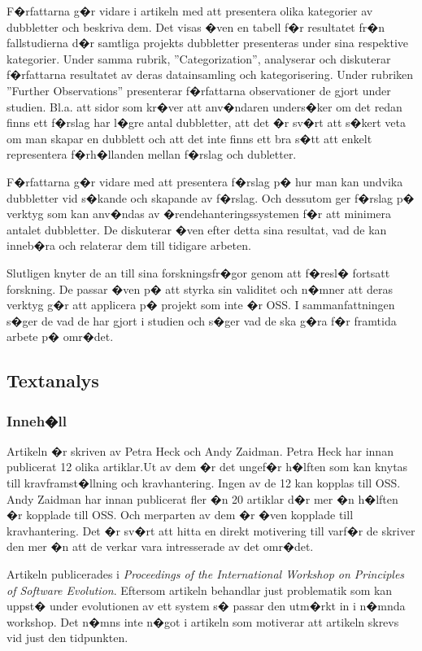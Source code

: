 \documentclass[11pt, oneside]{article}   	%
\begin{document}
F�rfattarna g�r vidare i artikeln med att presentera olika kategorier av dubbletter och beskriva dem. Det visas �ven en tabell f�r resultatet fr�n fallstudierna d�r samtliga projekts dubbletter presenteras under sina respektive kategorier. Under samma  rubrik, ''Categorization'', analyserar och diskuterar f�rfattarna resultatet av deras datainsamling och kategorisering. Under rubriken ''Further Observations'' presenterar f�rfattarna observationer de gjort under studien. Bl.a. att sidor som kr�ver att anv�ndaren unders�ker om det redan finns ett f�rslag har l�gre antal dubbletter, att det �r sv�rt att s�kert veta om man skapar en dubblett och att det inte finns ett bra s�tt att enkelt representera f�rh�llanden mellan f�rslag och dubletter.

F�rfattarna g�r vidare med att presentera f�rslag p� hur man kan undvika dubbletter vid s�kande och skapande av f�rslag. Och dessutom ger f�rslag p� verktyg som kan anv�ndas av �rendehanteringssystemen f�r att minimera antalet dubbletter. De diskuterar �ven efter detta sina resultat, vad de kan inneb�ra och relaterar dem till tidigare arbeten.

Slutligen knyter de an till sina forskningsfr�gor genom att f�resl� fortsatt forskning. De passar �ven p� att styrka sin validitet och n�mner att deras verktyg g�r att applicera p� projekt som inte �r OSS. I sammanfattningen s�ger de vad de har gjort i studien och s�ger vad de ska g�ra f�r framtida arbete p� omr�det.

\subsection{Textanalys}
\subsubsection{Inneh�ll}
Artikeln �r skriven av Petra Heck och Andy Zaidman. Petra Heck har innan \cite{Heck2013} publicerat 12 olika artiklar.Ut av dem �r det ungef�r h�lften som kan knytas till kravframst�llning och kravhantering. Ingen av de 12 kan kopplas till OSS. Andy Zaidman har innan \cite{Heck2013} publicerat fler �n 20 artiklar d�r mer �n h�lften �r kopplade till OSS. Och merparten av dem �r �ven kopplade till kravhantering. Det �r sv�rt att hitta en direkt motivering till varf�r de skriver den mer �n att de verkar vara intresserade av det omr�det.

Artikeln publicerades i \emph{Proceedings of the International Workshop on Principles of Software Evolution}. Eftersom artikeln behandlar just problematik som kan uppst� under evolutionen av ett system s� passar den utm�rkt in i n�mnda workshop. Det n�mns inte n�got i artikeln som motiverar att artikeln skrevs vid just den tidpunkten.
\end{document}
